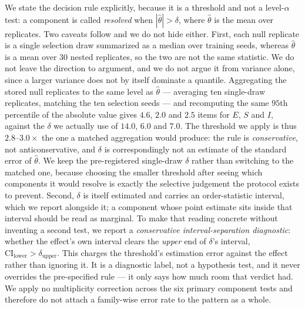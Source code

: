 \documentclass[10pt,twocolumn]{article}
\begin{document}
We state the decision rule explicitly, because it is a threshold and not a level-$\alpha$ test:
a component is called \emph{resolved} when $|\hat\theta| > \delta$, where $\hat\theta$ is the
mean over replicates. Two caveats follow and we do not hide either. First, each null replicate
is a single selection draw summarized as a median over training seeds, whereas $\hat\theta$ is a
mean over $30$ nested replicates, so the two are not the same statistic. We do not leave the
direction to argument, and we do not argue it from variance alone, since a larger variance does
not by itself dominate a quantile. Aggregating the stored null replicates to the same level as
$\hat\theta$ --- averaging ten single-draw replicates, matching the ten selection seeds --- and
recomputing the same $95$th percentile of the absolute value gives $4.6$, $2.0$ and $2.5$ items
for $E$, $S$ and $I$, against the $\delta$ we actually use of $14.0$, $6.0$ and $7.0$. The
threshold we apply is thus $2.8$--$3.0\times$ the one a matched aggregation would produce: the
rule is \emph{conservative}, not anticonservative, and $\delta$ is correspondingly not an
estimate of the standard error of $\hat\theta$. We keep the pre-registered single-draw
$\delta$ rather than switching to the matched one, because choosing the smaller threshold after
seeing which components it would resolve is exactly the selective judgement the protocol exists
to prevent. Second, $\delta$ is itself estimated and carries an order-statistic interval,
which we report alongside it; a component whose point estimate sits inside that interval should
be read as marginal. To make that reading concrete without inventing a second test, we report a
\emph{conservative interval-separation diagnostic}: whether the effect's own interval clears the
\emph{upper} end of $\delta$'s interval,
$\mathrm{CI}_{\mathrm{lower}} > \delta_{\mathrm{upper}}$. This charges the threshold's estimation
error against the effect rather than ignoring it. It is a diagnostic label, not a hypothesis
test, and it never overrides the pre-specified rule --- it only says how much room that verdict
had. We apply no multiplicity correction across the six primary component tests
and therefore do not attach a family-wise error rate to the pattern as a whole.
\end{document}
